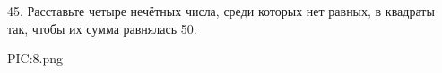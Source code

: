 45. Расставьте четыре нечётных числа, среди которых нет равных, в квадраты так, чтобы их сумма равнялась 50.
\begin{center}
{{PIC:8.png}}
\end{center}
